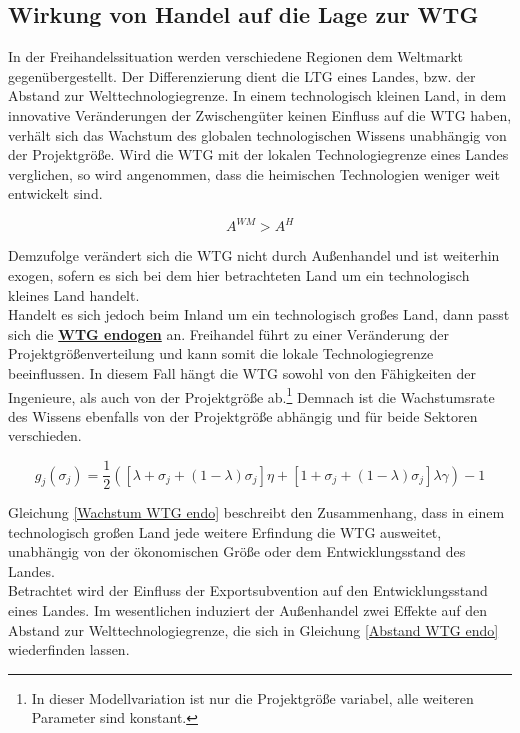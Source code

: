 \subsection{Wirkung von Handel auf die Lage zur WTG}\label{sec:Wirkung von Handel auf die Lage zur Welttechnologiegrenze} \label{Efekkte}

In der Freihandelssituation werden verschiedene Regionen dem Weltmarkt gegenübergestellt. Der Differenzierung dient die LTG eines Landes, bzw. der Abstand zur Welttechnologiegrenze. In einem technologisch kleinen Land, in dem innovative Veränderungen der Zwischengüter keinen Einfluss auf die WTG haben, verhält sich das Wachstum des globalen technologischen Wissens unabhängig von der Projektgröße. Wird die WTG mit der lokalen Technologiegrenze eines Landes verglichen, so wird angenommen, dass die heimischen Technologien weniger weit entwickelt sind. 


	\begin{equation}
		A^{WM}>A^H
	\end{equation}
	
	
Demzufolge verändert sich die WTG nicht durch Außenhandel und ist weiterhin exogen, sofern es sich bei dem hier betrachteten Land um ein technologisch kleines Land handelt.\\ 
Handelt es sich jedoch beim Inland um ein technologisch großes Land, dann passt sich die \textbf{\uline{WTG endogen}} an.  Freihandel führt zu einer Veränderung der Projektgrößenverteilung und kann somit die lokale Technologiegrenze beeinflussen.   
In diesem Fall hängt die WTG sowohl von den Fähigkeiten der Ingenieure, als auch von der Projektgröße ab.\footnote{In dieser Modellvariation ist nur die Projektgröße variabel, alle weiteren Parameter sind konstant.} Demnach ist die Wachstumsrate des Wissens ebenfalls von der Projektgröße abhängig und für beide Sektoren verschieden. 


	\begin{equation}
		g_j(\sigma_j)=\frac{1}{2}\left([\lambda+\sigma_j+(1-\lambda)\sigma_j]\eta+[1+\sigma_j+(1-\lambda)\sigma_j]\lambda\gamma\right)-1\label{Wachstum WTG endo}
	\end{equation}


Gleichung \eqref{Wachstum WTG endo} beschreibt den Zusammenhang, dass in einem technologisch großen Land jede weitere Erfindung die WTG ausweitet, unabhängig von der ökonomischen Größe oder dem Entwicklungsstand des Landes.\\
Betrachtet wird der Einfluss der Exportsubvention auf den Entwicklungsstand eines Landes. Im wesentlichen induziert der Außenhandel zwei Effekte auf den Abstand zur Welttechnologiegrenze, die sich in Gleichung \eqref{Abstand WTG endo} wiederfinden lassen.  


